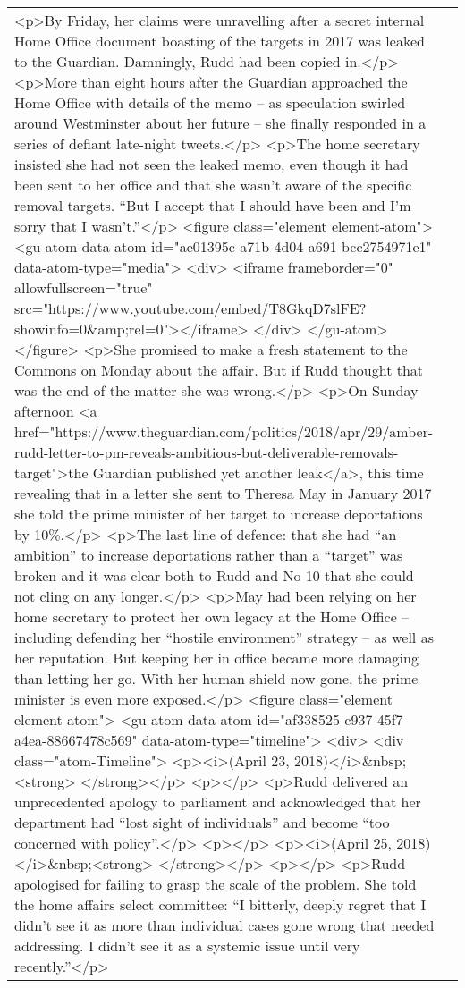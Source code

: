 \documentclass[]{article}
\begin{document}
\begin{table}[!h]
{\begin{tabular}[t]{ll}
<p>By Friday, her claims were unravelling after a secret internal Home Office document boasting of the targets in 2017 was leaked to the Guardian. Damningly, Rudd had been copied in.</p> 
<p>More than eight hours after the Guardian approached the Home Office with details of the memo – as speculation swirled around Westminster about her future – she finally responded in a series of defiant late-night tweets.</p> 
<p>The home secretary insisted she had not seen the leaked memo, even though it had been sent to her office and that she wasn’t aware of the specific removal targets. “But I accept that I should have been and I’m sorry that I wasn’t.”</p> 
<figure class="element element-atom"> 
 <gu-atom data-atom-id="ae01395c-a71b-4d04-a691-bcc2754971e1" data-atom-type="media"> 
  <div>
   <iframe frameborder="0" allowfullscreen="true" src="https://www.youtube.com/embed/T8GkqD7slFE?showinfo=0\&amp;rel=0"></iframe>
  </div>
 </gu-atom> 
</figure> 
<p>She promised to make a fresh statement to the Commons on Monday about the affair. But if Rudd thought that was the end of the matter she was wrong.</p> 
<p>On Sunday afternoon <a href="https://www.theguardian.com/politics/2018/apr/29/amber-rudd-letter-to-pm-reveals-ambitious-but-deliverable-removals-target">the Guardian published yet another leak</a>, this time revealing that in a letter she sent to Theresa May in January 2017 she told the prime minister of her target to increase deportations by 10\%.</p> 
<p>The last line of defence: that she had “an ambition” to increase deportations rather than a “target” was broken and it was clear both to Rudd and No 10 that she could not cling on any longer.</p> 
<p>May had been relying on her home secretary to protect her own legacy at the Home Office – including defending her “hostile environment” strategy – as well as her reputation. But keeping her in office became more damaging than letting her go. With her human shield now gone, the prime minister is even more exposed.</p> 
<figure class="element element-atom"> 
 <gu-atom data-atom-id="af338525-c937-45f7-a4ea-88667478c569" data-atom-type="timeline"> 
  <div>
   <div class="atom-Timeline">
    <p><i>(April 23, 2018)</i>\&nbsp;<strong> </strong></p>
    <p></p>
    <p>Rudd delivered an unprecedented apology to parliament and acknowledged that her department had “lost sight of individuals” and become “too concerned with policy”.</p>
    <p></p>
    <p><i>(April 25, 2018)</i>\&nbsp;<strong> </strong></p>
    <p></p>
    <p>Rudd apologised for failing to grasp the scale of the problem. She told the home affairs select committee: “I bitterly, deeply regret that I didn’t see it as more than individual cases gone wrong that needed addressing. I didn’t see it as a systemic issue until very recently.”</p>

\end{tabular}}
\end{table}
\end{document}
